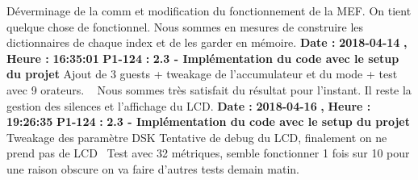 \documentclass{article}%
\begin{document}
\newline%
%
Déverminage de la comm et modification du fonctionnement de la MEF. On tient quelque chose de fonctionnel. Nous sommes en mesures de construire les dictionnaires de chaque index et de les garder en mémoire.\newline%
\newline%
%
\textbf{Date : }%
\textbf{2018{-}04{-}14}%
\textbf{,}%
\textbf{ Heure : }%
\textbf{16:35:01}%
\newline%
%
\textbf{P1{-}124 }%
\textbf{ : }%
\textbf{ 2.3 {-} Implémentation du code avec le setup du projet}%
\newline%
\newline%
%
Ajout de 3 guests + tweakage de l'accumulateur et du mode + test avec 9 orateurs.\newline%
~\newline%
Nous sommes très satisfait du résultat pour l'instant. Il reste la gestion des silences et l'affichage du LCD.\newline%
\newline%
%
\textbf{Date : }%
\textbf{2018{-}04{-}16}%
\textbf{,}%
\textbf{ Heure : }%
\textbf{19:26:35}%
\newline%
%
\textbf{P1{-}124 }%
\textbf{ : }%
\textbf{ 2.3 {-} Implémentation du code avec le setup du projet}%
\newline%
\newline%
%
Tweakage des paramètre DSK\newline%
Tentative de debug du LCD, finalement on ne prend pas de LCD~\newline%
Test avec 32 métriques, semble fonctionner 1 fois sur 10 pour une raison obscure on va faire d'autres tests demain matin.\newline%
\newline%
%
\newpage

%
\end{document}

